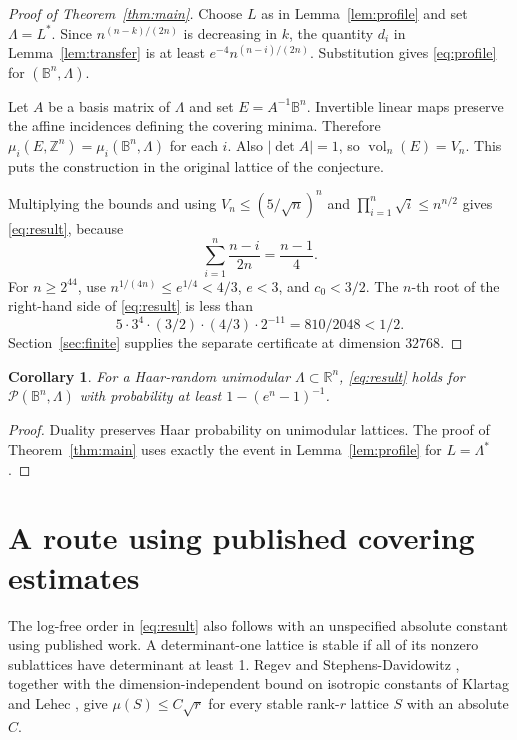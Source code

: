 \documentclass[11pt]{article}
\newtheorem{corollary}[theorem]{Corollary}
\newcommand{\B}{\mathbb B}
\newcommand{\R}{\mathbb R}
\newcommand{\Z}{\mathbb Z}
\newcommand{\vol}{\operatorname{vol}}
\newcommand{\Pcov}{\mathcal P}
\begin{document}
\begin{proof}[Proof of Theorem~\ref{thm:main}]
Choose \(L\) as in Lemma~\ref{lem:profile} and set \(\Lambda=L^*\).
Since \(n^{(n-k)/(2n)}\) is decreasing in \(k\), the quantity \(d_i\)
in Lemma~\ref{lem:transfer} is at least
\(e^{-4}n^{(n-i)/(2n)}\).
Substitution gives \eqref{eq:profile} for \((\B^n,\Lambda)\).

Let \(A\) be a basis matrix of \(\Lambda\) and set \(E=A^{-1}\B^n\).
Invertible linear maps preserve the affine incidences defining
the covering minima. Therefore
\(\mu_i(E,\Z^n)=\mu_i(\B^n,\Lambda)\) for each \(i\).
Also \(|\det A|=1\), so \(\vol_n(E)=V_n\).
This puts the construction in the original lattice of the conjecture.

Multiplying the bounds and using
\(V_n\le(5/\sqrt n)^n\) and \(\prod_{i=1}^n\sqrt i\le n^{n/2}\)
gives \eqref{eq:result}, because
\[
 \sum_{i=1}^n \frac{n-i}{2n}=\frac{n-1}{4}.
\]
For \(n\ge 2^{44}\), use \(n^{1/(4n)}\le e^{1/4}<4/3\),
\(e<3\), and \(c_0<3/2\). The \(n\)-th root of the right-hand side
of \eqref{eq:result} is less than
\[
 5\cdot 3^4\cdot (3/2)\cdot(4/3)\cdot 2^{-11}
   =810/2048<1/2 .
\]
Section~\ref{sec:finite} supplies the separate certificate at
dimension \(32768\).
\end{proof}

\begin{corollary}
For a Haar-random unimodular \(\Lambda\subset\R^n\),
\eqref{eq:result} holds for \(\Pcov(\B^n,\Lambda)\) with probability
at least \(1-(e^n-1)^{-1}\).
\end{corollary}
\begin{proof}
Duality preserves Haar probability on unimodular lattices.
The proof of Theorem~\ref{thm:main} uses exactly the event in
Lemma~\ref{lem:profile} for \(L=\Lambda^*\).
\end{proof}

\section{A route using published covering estimates}

The log-free order in \eqref{eq:result} also follows with an
unspecified absolute constant using published work. A determinant-one
lattice is stable if all of its nonzero sublattices have determinant
at least 1. Regev and Stephens-Davidowitz \cite[Thm.~6.7]{RSD},
together with the dimension-independent bound on isotropic constants
of Klartag and Lehec \cite{Slicing}, give
\(\mu(S)\le C\sqrt r\) for every stable rank-\(r\) lattice \(S\)
with an absolute \(C\).
\end{document}
